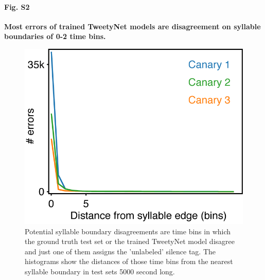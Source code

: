 \documentclass[10pt,letterpaper]{article}
\begin{document}
\paragraph*{Fig. S2}
\label{S2_Fig}
{\bf Most errors of trained TweetyNet models are disagreement on syllable boundaries of 0-2 time bins.}
\begin{figure}[!h]
\includegraphics[scale=1.0]{Figures/Supplementaries/EdgeErrorDistCanaries.png}
\caption{Potential syllable boundary disagreements are time bins in which the ground truth test set or the trained TweetyNet model disagree and just one of them assigns the 'unlabeled' silence tag. The histograms show the distances of those time bins from the nearest syllable boundary in test sets 5000 second long.}
\label{supp_fig_2}
\end{figure}



\nolinenumbers

%
%
% 






\end{document}
